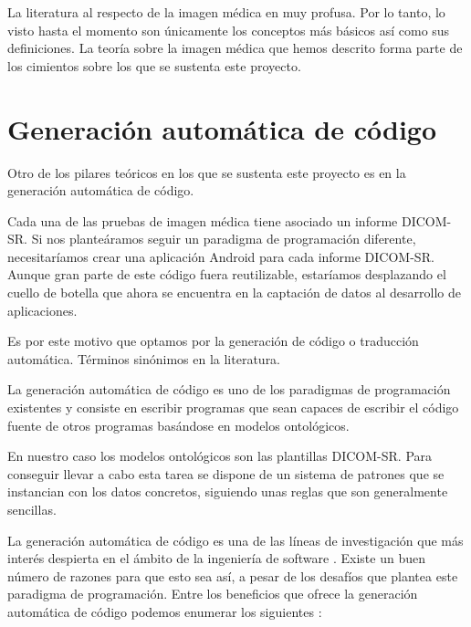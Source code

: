 La literatura al respecto de la imagen médica en muy profusa. Por lo tanto, lo visto hasta el momento son únicamente los conceptos más básicos así como sus definiciones. La teoría sobre la imagen médica que hemos descrito forma parte de los cimientos sobre los que se sustenta este proyecto.\par

\section{Generación automática de código}
Otro de los pilares teóricos en los que se sustenta este proyecto es en la generación automática de código.\par
Cada una de las pruebas de imagen médica tiene asociado un informe DICOM-SR. Si nos planteáramos seguir un paradigma de programación diferente, necesitaríamos crear una aplicación Android para cada informe DICOM-SR. Aunque gran parte de este código fuera reutilizable, estaríamos desplazando el cuello de botella que ahora se encuentra en la captación de datos al desarrollo de aplicaciones.\par
Es por este motivo que optamos por la generación de código o traducción automática. Términos sinónimos en la literatura.\cite{802346}\medskip\par 
La generación automática de código es uno de los paradigmas de programación existentes y consiste en escribir programas que sean capaces de escribir el código fuente de otros programas basándose en modelos ontológicos.\par 
En nuestro caso los modelos ontológicos son las plantillas DICOM-SR. Para conseguir llevar a cabo esta tarea se dispone de un sistema de patrones que se instancian con los datos concretos, siguiendo unas reglas que son generalmente sencillas.\medskip\par
La generación automática de código es una de las líneas de investigación que más interés despierta en el ámbito de la ingeniería de software \cite{hinchey2005requirements}. Existe un buen número de razones para que esto sea así, a pesar de los desafíos que plantea este paradigma de programación. Entre los beneficios que ofrece la generación automática de código podemos enumerar los siguientes \cite{herrington2003code}:
